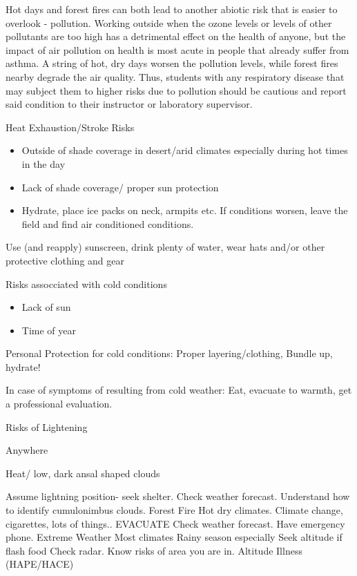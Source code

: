 \documentclass[12pt]{../SOP4_alpha}\usepackage[]{graphicx}\usepackage[]{color}
\begin{document}
\NP Hot days and forest fires can both lead to another abiotic risk that is easier to overlook - pollution. Working outside when the ozone levels or levels of other pollutants are too high has a detrimental effect on the health of anyone, but the impact of air pollution on health is most acute in people that already suffer from asthma. A string of hot, dry days worsen the pollution levels, while forest fires nearby degrade the air quality. Thus, students with any respiratory disease that may subject them to higher risks due to pollution should be cautious and report said condition to their instructor or laboratory supervisor. 

\NP Heat Exhaustion/Stroke Risks

\begin{itemize}
  \item Outside of shade coverage in desert/arid climates especially during hot times in the day
  \item Lack of shade coverage/ proper sun protection
  \item Hydrate, place ice packs on neck, armpits etc. If conditions worsen, leave the field and find air conditioned conditions.
  \end{itemize}  
  
Use (and reapply) sunscreen, drink plenty of water, wear hats and/or other protective clothing and gear

\NP Risks assocciated with cold conditions

\begin{itemize}
  \item Lack of sun
  \item Time of year
\end{itemize}

\NP Personal Protection for cold conditions: Proper layering/clothing, Bundle up, hydrate! 

\NP In case of symptoms of resulting from cold weather: Eat, evacuate to warmth, get a professional evaluation.


\NP Risks of Lightening

Anywhere

Heat/ low, dark ansal shaped clouds

Assume lightning position- seek shelter.
Check weather forecast. Understand how to identify cumulonimbus clouds.
Forest Fire
Hot dry climates.
Climate change, cigarettes, lots of things..
EVACUATE
Check weather forecast. Have emergency phone.
Extreme Weather
Most climates
Rainy season especially
Seek altitude if flash food
Check radar. Know risks of area you are in.
Altitude Illness (HAPE/HACE)
\end{document}
